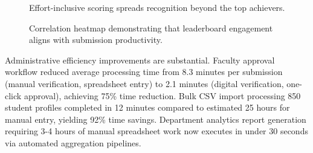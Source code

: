\documentclass[12pt]{article}
\begin{document}
\begin{figure}[t]
\centering
{}
\caption{Effort-inclusive scoring spreads recognition beyond the top achievers.}
\label{fig:distribution}
\end{figure}

\begin{figure}[t]
\centering
{}
\caption{Correlation heatmap demonstrating that leaderboard engagement aligns with submission productivity.}
\label{fig:heatmap}
\end{figure}

Administrative efficiency improvements are substantial. Faculty approval workflow reduced average processing time from 8.3 minutes per submission (manual verification, spreadsheet entry) to 2.1 minutes (digital verification, one-click approval), achieving 75\% time reduction. Bulk CSV import processing 850 student profiles completed in 12 minutes compared to estimated 25 hours for manual entry, yielding 92\% time savings. Department analytics report generation requiring 3-4 hours of manual spreadsheet work now executes in under 30 seconds via automated aggregation pipelines.
\end{document}
